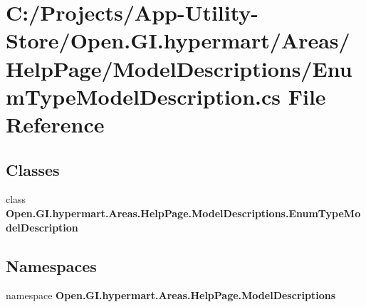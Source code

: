 \section{C\+:/\+Projects/\+App-\/\+Utility-\/\+Store/\+Open.G\+I.\+hypermart/\+Areas/\+Help\+Page/\+Model\+Descriptions/\+Enum\+Type\+Model\+Description.cs File Reference}
\label{_enum_type_model_description_8cs}
\subsection*{Classes}
\begin{DoxyCompactItemize}
\item 
class \textbf{ Open.\+G\+I.\+hypermart.\+Areas.\+Help\+Page.\+Model\+Descriptions.\+Enum\+Type\+Model\+Description}
\end{DoxyCompactItemize}
\subsection*{Namespaces}
\begin{DoxyCompactItemize}
\item 
namespace \textbf{ Open.\+G\+I.\+hypermart.\+Areas.\+Help\+Page.\+Model\+Descriptions}
\end{DoxyCompactItemize}
